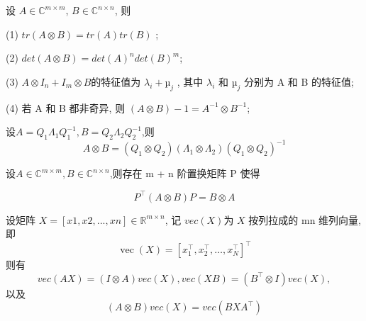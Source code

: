 \documentclass[12pt,a4paper]{article}
\begin{document}
\begin{framed}
	\begin{theorem}
		设 $A ∈ \mathbb{C}^{m×m}$, $B ∈ \mathbb{C}^{n×n}$, 则
		
		(1) $tr(A ⊗ B) = tr(A)tr(B)$ ;
		
		(2) $det(A ⊗ B) = det(A)^n det(B)^m $;
		
		(3) $A ⊗ I_n + I_m ⊗ B $的特征值为 $λ_i + µ_j$ , 其中 $λ_i$ 和 $µ_j$ 分别为 A 和 B 的特征值;
		
		(4) 若 A 和 B 都非奇异, 则 $(A ⊗ B)−1 = A^{−1} ⊗ B^{−1}$;	
	\end{theorem}
\end{framed}

\begin{framed}
	\begin{corollary}
		设$A=Q_{1} \Lambda_{1} Q_{1}^{-1}, B=Q_{2} \Lambda_{2} Q_{2}^{-1}$,则
		$$
		A \otimes B=\left(Q_{1} \otimes Q_{2}\right)\left(\Lambda_{1} \otimes \Lambda_{2}\right)\left(Q_{1} \otimes Q_{2}\right)^{-1}
		$$	
	\end{corollary}
\end{framed}

\begin{framed}
	\begin{theorem}
		设$A \in \mathbb{C}^{m \times m}, B \in \mathbb{C}^{n \times n}$,则存在 m + n 阶置换矩阵 P 使得
		
		$$
		P^{\top}(A \otimes B) P=B \otimes A
		$$
		
	\end{theorem}
\end{framed}

\begin{framed}
	\begin{theorem}
		设矩阵 $X = [x1, x2, . . . , xn] ∈ \mathbb{R}^{
		m×n}$, 记 $vec(X)$为 $X$ 按列拉成的
		mn 维列向量, 即
		$$
		\operatorname{vec}(X)=\left[x_{1}^{\top}, x_{2}^{\top}, \ldots, x_{N}^{\top}\right]^{\top}
		$$
		则有
		$$vec(AX) = (I ⊗ A)vec(X), vec(XB) = (B^{\top}⊗ I)vec(X),$$
		以及
		$$(A ⊗ B)vec(X) = vec(BXA^{\top}
		)$$
	\end{theorem}
\end{framed}
\end{document}

